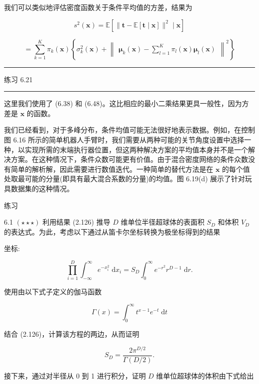 \documentclass[10pt]{article}
\newcommand{\HRule}{\begin{center}\rule{0.9\linewidth}{0.2mm}\end{center}}
\begin{document}
我们可以类似地评估密度函数关于条件平均值的方差，结果为

\[
{s}^{2}\left( \mathbf{x}\right)  = \mathbb{E}\left\lbrack  {\parallel \mathbf{t} - \mathbb{E}\left\lbrack  {\mathbf{t} \mid  \mathbf{x}}\right\rbrack  {\parallel }^{2} \mid  \mathbf{x}}\right\rbrack   \tag{6.49}
\]

\[
= \mathop{\sum }\limits_{{k = 1}}^{K}{\pi }_{k}\left( \mathbf{x}\right) \left\{  {{\sigma }_{k}^{2}\left( \mathbf{x}\right)  + {\begin{Vmatrix}{\mathbf{\mu }}_{k}\left( \mathbf{x}\right)  - \mathop{\sum }\limits_{{l = 1}}^{K}{\pi }_{l}\left( \mathbf{x}\right) {\mathbf{\mu }}_{l}\left( \mathbf{x}\right) \end{Vmatrix}}^{2}}\right\}   \tag{6.50}
\]

\HRule

练习 6.21

\HRule

这里我们使用了 (6.38) 和 (6.48)。这比相应的最小二乘结果更具一般性，因为方差是 \(\mathbf{x}\) 的函数。

我们已经看到，对于多峰分布，条件均值可能无法很好地表示数据。例如，在控制图 6.16 所示的简单机器人手臂时，我们需要从两种可能的关节角度设置中选择一种，以实现所需的末端执行器位置，但这两种解决方案的平均值本身并不是一个解决方案。在这种情况下，条件众数可能更有价值。由于混合密度网络的条件众数没有简单的解析解，因此需要进行数值迭代。一种简单的替代方法是在 \(\mathbf{x}\) 的每个值处取最可能的分量(即具有最大混合系数的分量)的均值。图 6.19(d) 展示了针对玩具数据集的这种情况。

练习

6.1 \(\left( {\star  \star   \star  }\right)\) 利用结果 (2.126) 推导 \(D\) 维单位半径超球体的表面积 \({S}_{D}\) 和体积 \({V}_{D}\) 的表达式。为此，考虑以下通过从笛卡尔坐标转换为极坐标得到的结果

坐标:

\[
\mathop{\prod }\limits_{{i = 1}}^{D}{\int }_{-\infty }^{\infty }{e}^{-{x}_{i}^{2}}\mathrm{\;d}{x}_{i} = {S}_{D}{\int }_{0}^{\infty }{e}^{-{r}^{2}}{r}^{D - 1}\mathrm{\;d}r. \tag{6.51}
\]

使用由以下式子定义的伽马函数

\[
\Gamma \left( x\right)  = {\int }_{0}^{\infty }{t}^{x - 1}{e}^{-t}\mathrm{\;d}t \tag{6.52}
\]

结合 (2.126)，计算该方程的两边，从而证明

\[
{S}_{D} = \frac{2{\pi }^{D/2}}{\Gamma \left( {D/2}\right) }. \tag{6.53}
\]

接下来，通过对半径从 0 到 1 进行积分，证明 \(D\) 维单位超球体的体积由下式给出
\end{document}
